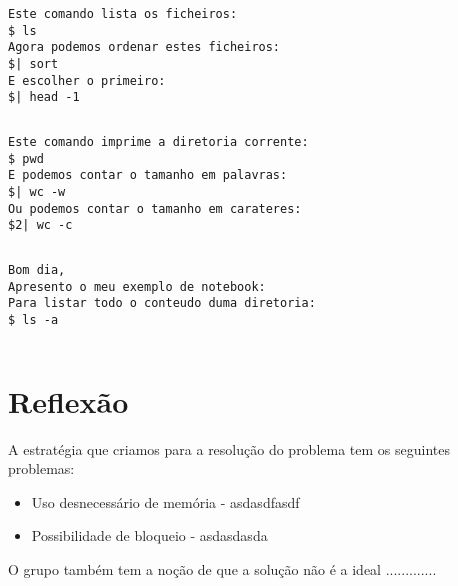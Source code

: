 \documentclass[a4paper]{article}
\begin{document}
\begin{lstlisting}[caption=1º Exemplo]
Este comando lista os ficheiros:
$ ls
Agora podemos ordenar estes ficheiros:
$| sort
E escolher o primeiro:
$| head -1
\end{lstlisting}

\begin{lstlisting}[caption=Resultado do 1º Exemplo]

\end{lstlisting}


\begin{lstlisting}[caption=2º Exemplo]
Este comando imprime a diretoria corrente:
$ pwd
E podemos contar o tamanho em palavras:
$| wc -w
Ou podemos contar o tamanho em carateres:
$2| wc -c
\end{lstlisting}


\begin{lstlisting}[caption=Resultado do 2º Exemplo]

\end{lstlisting}


\begin{lstlisting}[caption=3º Exemplo]
Bom dia,
Apresento o meu exemplo de notebook:
Para listar todo o conteudo duma diretoria:
$ ls -a
\end{lstlisting}


\begin{lstlisting}[caption=Resultado do 3º Exemplo]

\end{lstlisting}




\section{Reflexão}
\label{sec:reflexao}

A estratégia que criamos para a resolução do problema tem os seguintes problemas:

\begin{itemize}
  \item{Uso desnecessário de memória - asdasdfasdf}
  \item{Possibilidade de bloqueio - asdasdasda}
\end{itemize}

O grupo também tem a noção de que a solução não é a ideal .............
\end{document}
